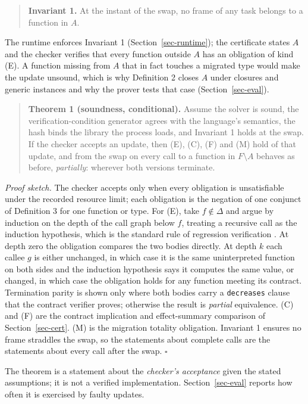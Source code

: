 \documentclass[10pt,twocolumn]{article}
\begin{document}
\begin{quote}
\textbf{Invariant 1.} At the instant of the swap, no frame of any task belongs to a function in $A$.
\end{quote}
The runtime enforces Invariant 1 (Section~\ref{sec-runtime}); the certificate states $A$ and the checker verifies that every function outside $A$ has an obligation of kind (E). A function missing from $A$ that in fact touches a migrated type would make the update unsound, which is why Definition 2 closes $A$ under closures and generic instances and why the prover tests that case (Section~\ref{sec-eval}).

\begin{quote}
\textbf{Theorem 1 (soundness, conditional).} Assume the solver is sound, the verification-condition generator agrees with the language's semantics, the hash binds the library the process loads, and Invariant 1 holds at the swap. If the checker accepts an update, then (E), (C), (F) and (M) hold of that update, and from the swap on every call to a function in $F \setminus A$ behaves as before, \emph{partially}: wherever both versions terminate.
\end{quote}
\emph{Proof sketch.} The checker accepts only when every obligation is unsatisfiable under the recorded resource limit; each obligation is the negation of one conjunct of Definition 3 for one function or type. For (E), take $f \notin \Delta$ and argue by induction on the depth of the call graph below $f$, treating a recursive call as the induction hypothesis, which is the standard rule of regression verification \cite{godlin2013regression}. At depth zero the obligation compares the two bodies directly. At depth $k$ each callee $g$ is either unchanged, in which case it is the same uninterpreted function on both sides and the induction hypothesis says it computes the same value, or changed, in which case the obligation holds for any function meeting its contract. Termination parity is shown only where both bodies carry a \texttt{decreases} clause that the contract verifier proves; otherwise the result is \emph{partial} equivalence. (C) and (F) are the contract implication and effect-summary comparison of Section~\ref{sec-cert}. (M) is the migration totality obligation. Invariant 1 ensures no frame straddles the swap, so the statements about complete calls are the statements about every call after the swap. $\square$

The theorem is a statement about the \emph{checker's acceptance} given the stated assumptions; it is not a verified implementation. Section~\ref{sec-eval} reports how often it is exercised by faulty updates.
\end{document}
